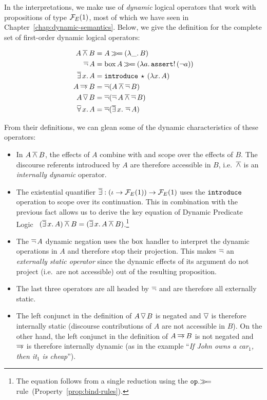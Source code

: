 In the interpretations, we make use of \emph{dynamic} logical operators
that work with propositions of type $\mathcal{F}_E(1)$, most of which we have seen
in Chapter~\ref{chap:dynamic-semantics}. Below, we give the definition for
the complete set of first-order dynamic logical operators:

\begin{align*}
  A \mathbin{\overline{\land}} B &= A \mathbin{\gg\!=} (\lambda \_.\, B) \\
  \mathop{\overline{\lnot}} A &= \mathrm{box}\,A \mathbin{\gg\!=} (\lambda a.\, \mathtt{assert}!\,(\lnot a)) \\
  \mathop{\overline{\exists}} x.\,A &= \mathtt{introduce}\,\star\,(\lambda x.\, A) \\
  A \mathbin{\overline{\to}} B &= \mathop{\overline{\lnot}} (A \mathbin{\overline{\land}} \mathop{\overline{\lnot}} B) \\
  A \mathop{\overline{\lor}} B &= \mathop{\overline{\lnot}} (\mathop{\overline{\lnot}} A \mathbin{\overline{\land}} \mathop{\overline{\lnot}} B) \\
  \mathop{\overline{\forall}} x.\,A &= \mathop{\overline{\lnot}} (\mathop{\overline{\exists}} x.\,\mathop{\overline{\lnot}} A)
\end{align*}

From their definitions, we can glean some of the dynamic characteristics of
these operators:

\begin{itemize}
\item In $A \mathbin{\overline{\land}} B$, the effects of $A$ combine with and scope over the
  effects of $B$. The discourse referents introduced by $A$ are therefore
  accessible in $B$, i.e.\ $\mathbin{\overline{\land}}$ is an \emph{internally dynamic}
  operator.
\item The existential quantifier
  $\mathop{\overline{\exists}} : (\iota \to \mathcal{F}_E(1)) \to \mathcal{F}_E(1)$ uses the $\mathtt{introduce}$
  operation to scope over its continuation. This in combination with the
  previous fact allows us to derive the key equation of Dynamic Predicate
  Logic~\cite{groenendijk1991dynamic}
  $(\mathop{\overline{\exists}} x.\,A) \mathbin{\overline{\land}} B = (\mathop{\overline{\exists}} x.\,A \mathbin{\overline{\land}} B)$.\footnote{The
    equation follows from a single reduction using the $\mathtt{op}.\mathbin{\gg\!=}$
    rule~(Property~\ref{prop:bind-rules}).}
\item The $\mathop{\overline{\lnot}} A$ dynamic negation uses the $\mathrm{box}$ handler to interpret
  the dynamic operations in $A$ and therefore stop their projection. This
  makes $\mathop{\overline{\lnot}}$ an \emph{externally static operator} since the dynamic
  effects of its argument do not project (i.e.\ are not accessible) out of
  the resulting proposition.
\item The last three operators are all headed by $\mathop{\overline{\lnot}}$ and are therefore
  all externally static.
\item The left conjunct in the definition of $A \mathop{\overline{\lor}} B$ is negated and
  $\mathop{\overline{\lor}}$ is therefore internally static (discourse contributions of $A$ are
  not accessible in $B$). On the other hand, the left conjunct in the
  definition of $A \mathbin{\overline{\to}} B$ is not negated and $\mathbin{\overline{\to}}$ is therefore
  internally dynamic (as in the example ``\emph{If John owns a car$_1$,
    then it$_1$ is cheap}'').
\end{itemize}


